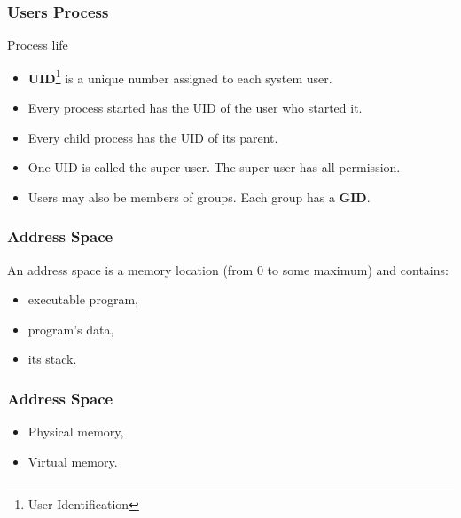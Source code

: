   \begin{frame}
    \frametitle{Users Process}
      \begin{block}{Process life}
        \begin{itemize}
          \item \textbf{UID}\footnote{User Identification} is a unique number assigned to each system user.
          \item Every process started has the UID of the user who started it.
          \item Every child process has the UID of its parent.
          \item One UID is called the super-user. The super-user has all permission.
          \item Users may also be members of groups. Each group has a \textbf{GID}.
        \end{itemize}
      \end{block}
  \end{frame}

  \begin{frame}
    \frametitle{Address Space}
    An address space is a memory location (from 0 to some maximum) and contains:
      \begin{itemize}
        \item executable program,
        \item program's data,
        \item its stack.
      \end{itemize}
  \end{frame}
  \begin{frame}
    \frametitle{Address Space}
      \begin{itemize}
        \item Physical memory,
        \item Virtual memory.
      \end{itemize}
  \end{frame}


